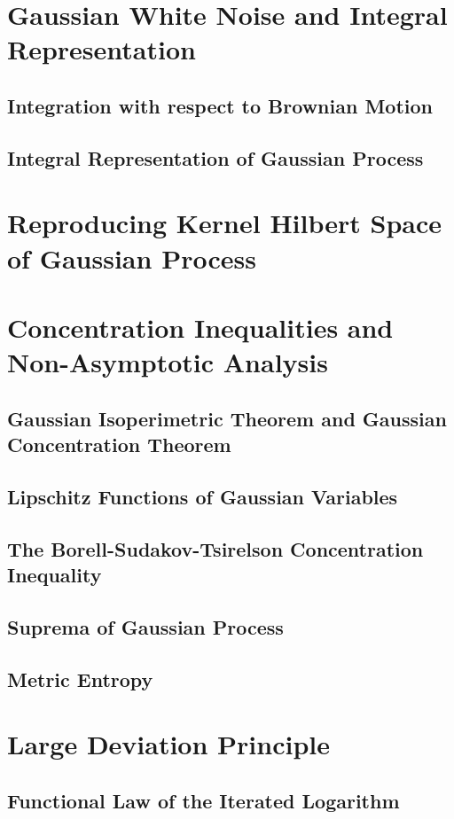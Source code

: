 \documentclass[11pt]{article}
\begin{document}
\section{Gaussian White Noise and Integral Representation}
\subsection{Integration with respect to Brownian Motion}
\subsection{Integral Representation of Gaussian Process}

\section{Reproducing Kernel Hilbert Space of Gaussian Process}




\section{Concentration Inequalities and Non-Asymptotic Analysis}
\subsection{Gaussian Isoperimetric Theorem and Gaussian Concentration Theorem}
\subsection{Lipschitz Functions of Gaussian Variables}
\subsection{The Borell-Sudakov-Tsirelson Concentration Inequality}
\subsection{Suprema of Gaussian Process}
\subsection{Metric Entropy}


\section{Large Deviation Principle}
\subsection{Functional Law of the Iterated Logarithm}
\end{document}
